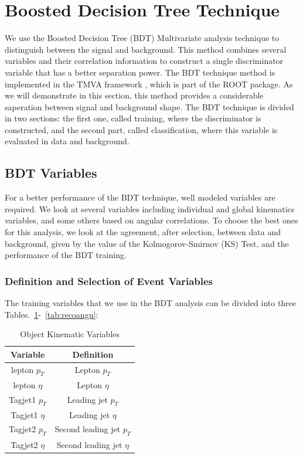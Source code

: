 \section{Boosted Decision Tree Technique}
\label{sec:BDT}
We use the Boosted Decision Tree (BDT) Multivariate analysis technique to 
distinguish between the signal and background. This method 
combines several variables and their correlation information to construct a single discriminator variable that has a better separation power. 
The BDT technique method is implemented in the TMVA framework \cite{Therhaag:2010zz}, which is part of the ROOT package. As we will 
demonstrate in this section, this method provides a considerable saperation between signal and background shape.
The BDT technique is divided in two sections: the first one, called training, 
where the discriminator is constructed, and the second part, called classification, where this variable is evaluated in data and background.

\subsection{BDT Variables}
For a better performance of the BDT technique, well modeled variables are required. We look at 
several variables including individual and global kinematics variables, and some others based on 
angular correlations. To choose the best ones for this analysis, we look at the agreement, after 
selection, between data and background, given by the value of the Kolmogorov-Smirnov (KS) Test,  
and the performance of the BDT training. 

\subsubsection{Definition and Selection of Event Variables}
The training variables that we use in the BDT analysis can be divided into three Tables.~\ref{tab:objkin}-~\ref{tab:recoangu}:

\begin{table}[h!]
\small
\begin{center}
\begin{tabular}{|c|c|}
\hline
Variable & Definition\\ \hline
lepton $p_{T}$  & Lepton $p_{T}$ \\ \hline
lepton $\eta$ & Lepton $\eta$ \\ \hline
Tagjet1 $p_{T}$ & Leading jet $p_{T}$ \\ \hline
Tagjet1 $\eta$ & Leading jet $\eta$ \\ \hline
Tagjet2 $p_{T}$ & Second leading jet $p_{T}$ \\ \hline
Tagjet2 $\eta$ & Second leading jet $\eta$ \\ \hline
\end{tabular}
\caption{Object Kinematic Variables}
\label{tab:objkin}
\end{center}
\end{table}


